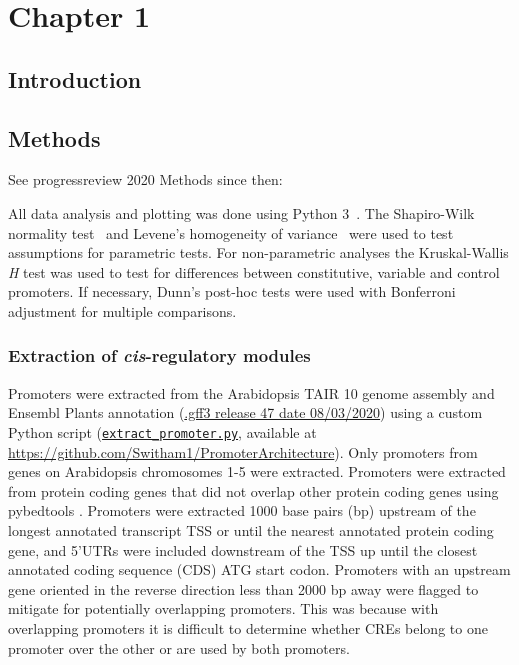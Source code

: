 \documentclass[../Sam_Witham_Thesis.tex]{subfiles}
\begin{document}
\chapter{Chapter 1}\label{ch:1}

\section{Introduction}\label{chapter1:introduction}
\section{Methods}\label{chapter1:methods}
See progressreview 2020
Methods since then:


All data analysis and plotting was done using Python 3~\autocite{pythoncoreteamPythonDynamicOpen2020}.
The Shapiro\hyp{}Wilk normality test~\autocite{shapiroAnalysisVarianceTest1965} and Levene's homogeneity of variance~\autocite{leveneRobustTestsEquality1960} were used to test assumptions for parametric tests.
For non\hyp{}parametric analyses the Kruskal\hyp{}Wallis \textit{H} test \autocite{kruskalUseRanksOneCriterion1952} was used to test for differences between constitutive, variable and control promoters.
If necessary, Dunn's post\hyp{}hoc tests \autocite{dunnMultipleComparisonsUsing1964} were used with Bonferroni adjustment for multiple comparisons.

\subsection{Extraction of \textit{cis}-regulatory modules}\label{chapter1:methods:extraction-of-cis-regulatory-modules}

Promoters were extracted from the Arabidopsis TAIR 10 \autocite{lameschArabidopsisInformationResource2012} genome assembly and Ensembl Plants \autocite{howeEnsemblGenomes20202020} annotation (\href{ftp://ftp.ensemblgenomes.org/pub/release-47/plants/gff3/arabidopsis_thaliana/}{.gff3 release 47 date 08/03/2020}) using a custom Python script (\href{https://github.com/Switham1/PromoterArchitecture/blob/master/src/data_sorting/extract_promoter.py}{\texttt{extract\_promoter.py}}, available at \url{https://github.com/Switham1/PromoterArchitecture}).
Only promoters from genes on Arabidopsis chromosomes 1-5 were extracted.
Promoters were extracted from protein coding genes that did not overlap other protein coding genes using pybedtools \autocite{dalePybedtoolsFlexiblePython2011}.
Promoters were extracted 1000 base pairs (bp) upstream of the longest annotated transcript TSS or until the nearest annotated protein coding gene, and 5'UTRs were included downstream of the TSS up until the closest annotated coding sequence (CDS) ATG start codon.
Promoters with an upstream gene oriented in the reverse direction less than 2000 bp away were flagged to mitigate for potentially overlapping promoters.
This was because with overlapping promoters it is difficult to determine whether CREs belong to one promoter over the other or are used by both promoters.
\end{document}
